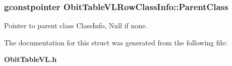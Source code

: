 \subsubsection{\setlength{\rightskip}{0pt plus 5cm}gconstpointer {\bf Obit\-Table\-VLRow\-Class\-Info::Parent\-Class}}\label{structObitTableVLRowClassInfo_o3}


Pointer to parent class Class\-Info, Null if none. 



The documentation for this struct was generated from the following file:\begin{CompactItemize}
\item 
{\bf Obit\-Table\-VL.h}\end{CompactItemize}
